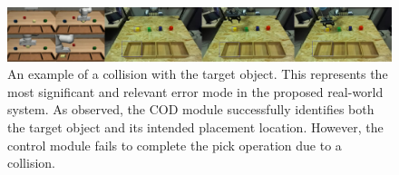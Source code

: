 \begin{figure}[t]
    \centering
    \includegraphics[width=1.0\textwidth]{figures/images/ch5/robot_rollout.jpg}
    \caption{An example of a collision with the target object. This represents the most significant and relevant error mode in the proposed real-world system. As observed, the COD module successfully identifies both the target object and its intended placement location. However, the control module fails to complete the pick operation due to a collision.}
    \label{fig:robot_rollout}
\end{figure}
